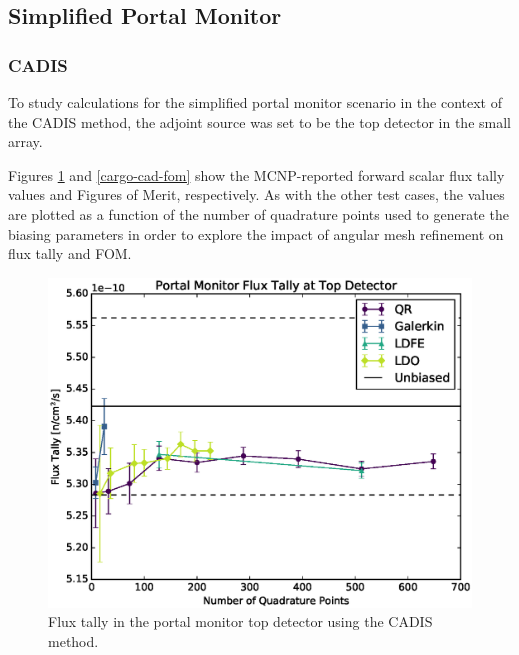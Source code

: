 \documentclass{article} %
\begin{document}
\FloatBarrier
\subsection{Simplified Portal Monitor}

\subsubsection{CADIS}

To study calculations for the simplified portal monitor scenario in the context
of the CADIS method, the adjoint source was set to be the top detector in the
small array.

Figures \ref{cargo-cad-tally} and \ref{cargo-cad-fom} show the MCNP-reported
forward scalar flux tally values and Figures of Merit, respectively. As with
the other test cases, the values are plotted as a function of the number of
quadrature points used to generate the biasing parameters in order to explore
the impact of angular mesh refinement on flux tally and FOM.

\begin{figure}[!htb]
\centering
\includegraphics[max height=0.445\textheight]{img/portal-cadis-tally.eps}
\caption{Flux tally in the portal monitor top detector using the CADIS method.}
\label{cargo-cad-tally}
\end{figure}
\end{document}
